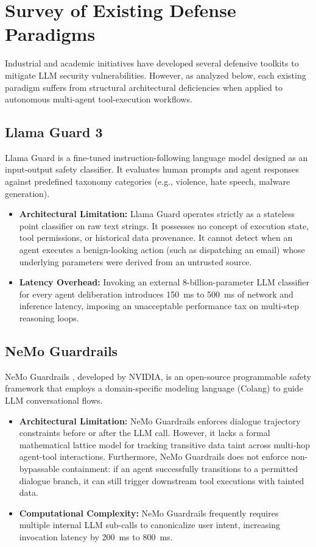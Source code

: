 \section{Survey of Existing Defense Paradigms}
Industrial and academic initiatives have developed several defensive toolkits to mitigate LLM security vulnerabilities. However, as analyzed below, each existing paradigm suffers from structural architectural deficiencies when applied to autonomous multi-agent tool-execution workflows.

\subsection{Llama Guard 3}
Llama Guard \cite{inan2023llamaguard} is a fine-tuned instruction-following language model designed as an input-output safety classifier. It evaluates human prompts and agent responses against predefined taxonomy categories (e.g., violence, hate speech, malware generation).
\begin{itemize}
    \item \textbf{Architectural Limitation:} Llama Guard operates strictly as a stateless point classifier on raw text strings. It possesses no concept of execution state, tool permissions, or historical data provenance. It cannot detect when an agent executes a benign-looking action (such as dispatching an email) whose underlying parameters were derived from an untrusted source.
    \item \textbf{Latency Overhead:} Invoking an external 8-billion-parameter LLM classifier for every agent deliberation introduces 150~ms to 500~ms of network and inference latency, imposing an unacceptable performance tax on multi-step reasoning loops.
\end{itemize}

\subsection{NeMo Guardrails}
NeMo Guardrails \cite{rebedea2023nemoguardrails}, developed by NVIDIA, is an open-source programmable safety framework that employs a domain-specific modeling language (Colang) to guide LLM conversational flows.
\begin{itemize}
    \item \textbf{Architectural Limitation:} NeMo Guardrails enforces dialogue trajectory constraints before or after the LLM call. However, it lacks a formal mathematical lattice model for tracking transitive data taint across multi-hop agent-tool interactions. Furthermore, NeMo Guardrails does not enforce non-bypassable containment: if an agent successfully transitions to a permitted dialogue branch, it can still trigger downstream tool executions with tainted data.
    \item \textbf{Computational Complexity:} NeMo Guardrails frequently requires multiple internal LLM sub-calls to canonicalize user intent, increasing invocation latency by 200~ms to 800~ms.
\end{itemize}

